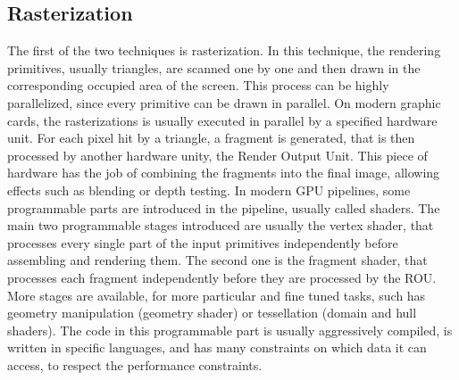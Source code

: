 \subsection{Rasterization}
The first of the two techniques is rasterization. In this technique, the rendering primitives, usually triangles, are scanned one by one and then drawn in the corresponding occupied area of the screen. This process can be highly parallelized, since every primitive can be drawn in parallel. On modern graphic cards, the rasterizations is usually executed in parallel by a specified hardware unit. For each pixel hit by a triangle, a fragment is generated, that is then processed by another hardware unity, the Render Output Unit. This piece of hardware has the job of combining the fragments into the final image, allowing effects such as blending or depth testing. In modern GPU pipelines, some programmable parts are introduced in the pipeline, usually called shaders. The main two programmable stages introduced are usually the vertex shader, that processes every single part of the input primitives independently before assembling and rendering them. The second one is the fragment shader, that processes each fragment independently before they are processed by the ROU. More stages are available, for more particular and fine tuned tasks, such has geometry manipulation (geometry shader) or tessellation (domain and hull shaders). The code in this programmable part is usually aggressively compiled, is written in specific languages, and has many constraints on which data it can access, to respect the performance constraints. 
 
 



